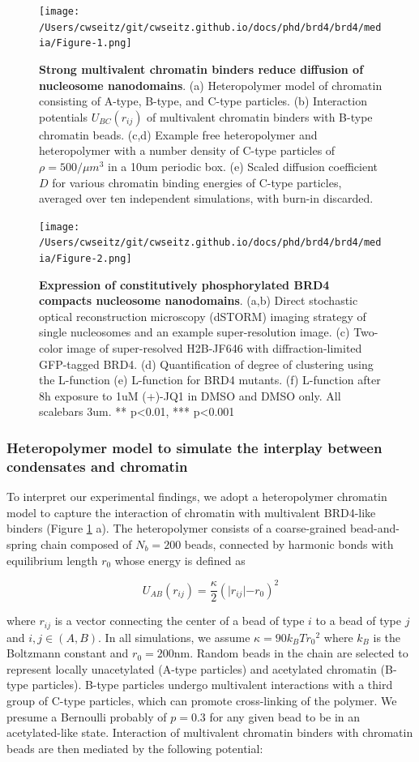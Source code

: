 \begin{figure}[t]
\texttt{[image: /Users/cwseitz/git/cwseitz.github.io/docs/phd/brd4/brd4/media/Figure-1.png]}
\caption{\textbf{Strong multivalent chromatin binders reduce diffusion of nucleosome nanodomains}. (a) Heteropolymer model of chromatin consisting of A-type, B-type, and C-type particles. (b) Interaction potentials $U_{BC}(r_{ij})$ of multivalent chromatin binders with B-type chromatin beads. (c,d) Example free heteropolymer and heteropolymer with a number density of C-type particles of $\rho=500/\mu m^3$ in a 10um periodic box. (e) Scaled diffusion coefficient $D$ for various chromatin binding energies of C-type particles, averaged over ten independent simulations, with burn-in discarded.}
\label{fig:fig24}
\end{figure}

\begin{figure}[t]
\texttt{[image: /Users/cwseitz/git/cwseitz.github.io/docs/phd/brd4/brd4/media/Figure-2.png]}
\caption{\textbf{Expression of constitutively phosphorylated BRD4 compacts nucleosome nanodomains}. (a,b) Direct stochastic optical reconstruction microscopy (dSTORM) imaging strategy of single nucleosomes and an example super-resolution image. (c) Two-color image of super-resolved H2B-JF646 with diffraction-limited GFP-tagged BRD4. (d) Quantification of degree of clustering using the L-function (e) L-function for BRD4 mutants. (f) L-function after 8h exposure to 1uM (+)-JQ1 in DMSO and DMSO only. All scalebars 3um. ** p<0.01, *** p<0.001}
\label{fig:fig25}
\end{figure}

\subsubsection{Heteropolymer model to simulate the interplay between condensates and chromatin}

To interpret our experimental findings, we adopt a heteropolymer chromatin model to capture the interaction of chromatin with multivalent BRD4-like binders (Figure \ref{fig:fig24} a). The heteropolymer consists of a coarse-grained bead-and-spring chain composed of $N_b=200$ beads, connected by harmonic bonds with equilibrium length $r_0$ whose energy is deﬁned as

\begin{equation}
U_{AB}(r_{ij})=\frac{\kappa}{2}(\lvert r_{ij}\lvert-r_0)^2
\end{equation}

where $r_{ij}$ is a vector connecting the center of a bead of type $i$ to a bead of type $j$ and $i,j \in (A,B)$. In all simulations, we assume $\kappa=90k_{B}T{r_0}^2$ where $k_{B}$ is the Boltzmann constant and $r_0=200$nm. Random beads in the chain are selected to represent locally unacetylated (A-type particles) and acetylated chromatin (B-type particles).  B-type particles undergo multivalent interactions with a third group of C-type particles, which can promote cross-linking of the polymer. We presume a Bernoulli probably of $p=0.3$ for any given bead to be in an acetylated-like state. Interaction of multivalent chromatin binders with chromatin beads are then mediated by the following potential:

